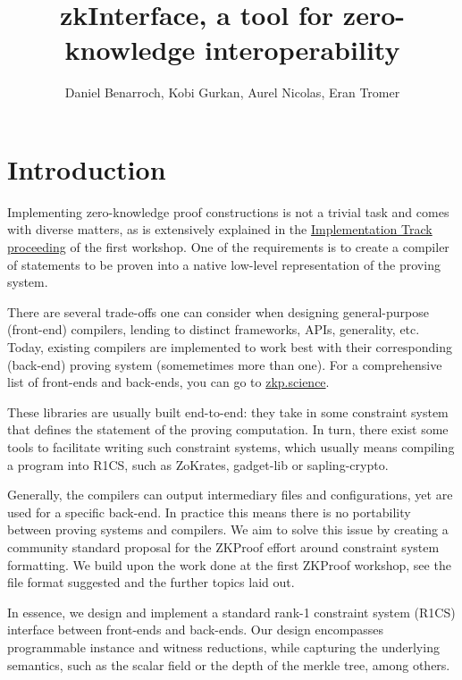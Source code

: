 \documentclass[a4paper,11pt]{article}
\title{zkInterface, a tool for zero-knowledge interoperability}
\author{Daniel Benarroch, Kobi Gurkan, Aurel Nicolas, Eran Tromer}
\begin{document}
	
	\maketitle
	
		
	
	\section{Introduction}
	Implementing zero-knowledge proof constructions is not a trivial task and comes with diverse matters, as is extensively explained in the \href{https://zkproof.org/proceedings-snapshots/zkproof-implementation-20180801.pdf}{Implementation Track proceeding} of the first workshop. One of the requirements is to create a compiler of statements to be proven into a native low-level representation of the proving system.
	
	There are several trade-offs one can consider when designing general-purpose (front-end) compilers, lending to distinct frameworks, APIs, generality, etc. Today, existing compilers are implemented to work best with their corresponding (back-end) proving system (somemetimes more than one). For a comprehensive list of front-ends and back-ends, you can go to \href{https://zkp.science}{zkp.science}. 
	
	These libraries are usually built end-to-end: they take in some constraint system that defines the statement of the proving computation. In turn, there exist some tools to facilitate writing such constraint systems, which usually means compiling a program into R1CS, such as ZoKrates, gadget-lib or sapling-crypto.
	
	Generally, the compilers can output intermediary files and configurations, yet are used for a specific back-end. In practice this means there is no portability between proving systems and compilers. We aim to solve this issue by creating a community standard proposal for the ZKProof effort around constraint system formatting. We build upon the work done at the first ZKProof workshop, see the file format suggested and the further topics laid out. 
	
	In essence, we design and implement a standard rank-1 constraint system (R1CS) interface between front-ends and back-ends. Our design encompasses programmable instance and witness reductions, while capturing the underlying semantics, such as the scalar field or the depth of the merkle tree, among others.
	
\end{document}
